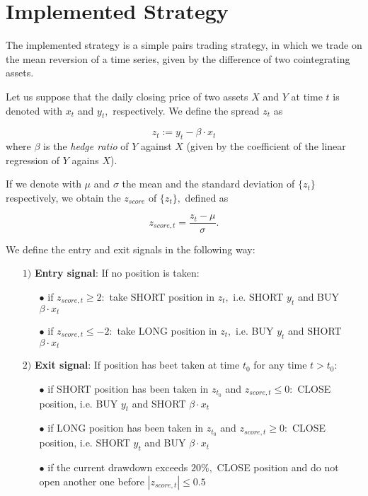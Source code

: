 \documentclass{paper}
\begin{document}
\section{Implemented Strategy}\label{section_implemented_strategy}

The implemented strategy is a simple pairs trading strategy, in which we trade on the mean reversion of a time series, given by the difference of two cointegrating assets. 

Let us suppose that the daily closing price of two assets $X$ and $Y$ at time $t$ is denoted with $x_t$ and $y_t,$ respectively. We define the spread $z_t$ as 

\begin{equation}\label{definition_spread}
z_t := y_t - \beta \cdot x_t
\end{equation}
where $\beta$ is the \textit{hedge ratio} of $Y$ against $X$ (given by the coefficient of the linear regression of $Y$ agains $X$).

If we denote with $\mu$ and $\sigma$ the mean and the standard deviation of $\{z_t\}$ respectively, we obtain the $z_{score}$ of $\{z_t\},$ defined as 

\begin{equation}
z_{score,t} = \frac{z_t - \mu}{\sigma}.
\end{equation}

We define the entry and exit signals in the following way:

\begin{itemize}

\item[$1)$] \textbf{Entry signal}: If no position is taken:
	\begin{itemize}
	\item[$\bullet$] if $z_{score,t} \geq 2: $ take SHORT position in $z_t,$ i.e. SHORT $y_t$ and
	BUY $\beta\cdot x_t$
	\item[$\bullet$] if $z_{score,t} \leq -2: $ take LONG position in $z_t,$ i.e. BUY $y_t$ and SHORT $\beta \cdot x_t$
	\end{itemize}

\item[$2)$] \textbf{Exit signal}: If position has beet taken at time $t_0$ for any time $t>t_0$:

	\begin{itemize}
	\item[$\bullet$] if SHORT position has been taken in $z_{t_0}$ and $z_{score,t} \leq 0:$ CLOSE position, i.e. BUY $y_t$ and SHORT $\beta\cdot x_t$
	\item[$\bullet$] if LONG position has been taken in $z_{t_0}$ and $z_{score,t} \geq 0:$ CLOSE position, i.e. SHORT $y_t$ and BUY $\beta\cdot x_t$
	\item[$\bullet$] if the current drawdown exceeds $20\%,$ CLOSE position and do not open another one before $|z_{score,t}| \leq 0.5$
	\end{itemize}

\end{itemize}
\end{document}
